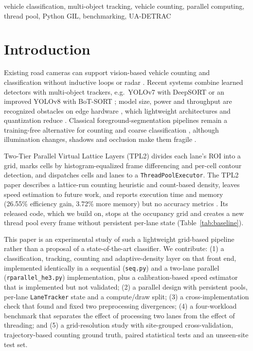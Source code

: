 \documentclass[conference]{IEEEtran}
\newcommand{\code}[1]{\texttt{#1}}
\begin{document}
\begin{IEEEkeywords}
vehicle classification, multi-object tracking, vehicle counting,
parallel computing, thread pool, Python GIL, benchmarking, UA-DETRAC
\end{IEEEkeywords}

\section{Introduction}
\label{sec:intro}
Existing road cameras can support vision-based vehicle counting and
classification without inductive loops or radar \cite{crouzil2016}.
Recent systems combine learned detectors with multi-object trackers,
e.g.\ YOLOv7 with DeepSORT \cite{lian2025} or an improved YOLOv8 with
BoT-SORT \cite{liu2025}; model size, power and throughput are recognized
obstacles on edge hardware \cite{zhai2023}, which lightweight
architectures and quantization reduce \cite{chang2025,macko2025}.
Classical foreground-segmentation pipelines remain a training-free
alternative for counting and coarse classification \cite{unzueta2012},
although illumination changes, shadows and occlusion make them fragile
\cite{abbas2021,chen2020}.

Two-Tier Parallel Virtual Lattice Layers (TPL2) \cite{baseline} divides
each lane's ROI into a grid, marks cells by histogram-equalized frame
differencing and per-cell contour detection, and dispatches cells and
lanes to a \code{ThreadPoolExecutor}. The TPL2 paper describes a
lattice-run counting heuristic and count-based density, leaves speed
estimation to future work, and reports execution time and memory
(26.55\% efficiency gain, 3.72\% more memory) but no accuracy metrics
\cite{baseline,muthuraja2026}. Its released code, which we build on,
stops at the occupancy grid and creates a new thread pool every frame
without persistent per-lane state (Table~\ref{tab:baseline}).

This paper is an experimental study of such a lightweight grid-based
pipeline rather than a proposal of a state-of-the-art classifier. We
contribute: (1) a classification, tracking, counting and
adaptive-density layer on that front end, implemented identically in a
sequential (\code{seq.py}) and a two-lane parallel
(\code{rparallel\_he3.py}) implementation, plus a calibration-based speed
estimator that is implemented but not validated; (2) a parallel design
with persistent pools, per-lane \code{LaneTracker} state and a
compute/draw split; (3) a cross-implementation check that found and fixed
two preprocessing divergences; (4) a four-workload benchmark that
separates the effect of processing two lanes from the effect of
threading; and (5) a grid-resolution study with site-grouped
cross-validation, trajectory-based counting ground truth, paired
statistical tests and an unseen-site test set.
\end{document}

